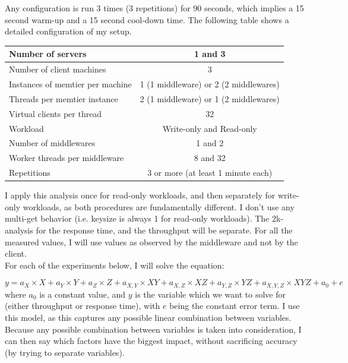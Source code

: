 \documentclass[11pt,a4paper]{article}
\begin{document}
Any configuration is run 3 times (3 repetitions) for 90 seconds, which implies a 15 second warm-up and a 15 second cool-down time.
The following table shows a detailed configuration of my setup.

\begin{center}
	\scriptsize{
		\begin{tabular}{|l|c|}
			\hline Number of servers                & 1 and 3                                     \\ 
			\hline Number of client machines        & 3                                           \\ 
			\hline Instances of memtier per machine & 1 (1 middleware) or 2 (2 middlewares) \\ 
			\hline Threads per memtier instance     & 2 (1 middleware) or 1 (2 middlewares)   \\
			\hline Virtual clients per thread       &  32                                     \\ 
			\hline Workload                         & Write-only and Read-only\\
			\hline Number of middlewares            & 1 and 2                                     \\
			\hline Worker threads per middleware    & 8 and 32                                    \\
			\hline Repetitions                      & 3 or more (at least 1 minute each)                                   \\ 
			\hline 
		\end{tabular}
	} 
\end{center}

I apply this analysis once for read-only workloads, and then separately for write-only workloads, as both procedures are fundamentally different.
I don't use any multi-get behavior (i.e. keysize is always 1 for read-only workloads).
The 2k-analysis for the response time, and the throughput will be separate.
For all the measured values, I will use values as observed by the middleware and not by the client. \\

For each of the experiments below, I will solve the equation:

\begin{equation}
	y = a_X \times X + a_Y \times Y + a_Z \times Z + a_{X, Y} \times X Y + a_{X, Z} \times X Z + a_{Y, Z} \times Y Z + a_{X, Y, Z} \times X Y Z + a_0 + e
\end{equation}
where $a_0$ is a constant value, and $y$ is the variable which we want to solve for (either throughput or response time), with $e$ being the constant error term.
I use this model, as this captures any possible linear combination between variables.
Because any possible combination between variables is taken into consideration, I can then say which factors have the biggest impact, without sacrificing accuracy (by trying to separate variables).
\end{document}
